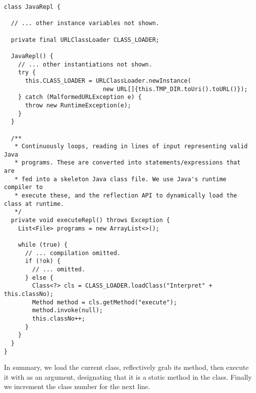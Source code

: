\begin{lstlisting}[language=MyJava]
class JavaRepl {

  // ... other instance variables not shown.

  private final URLClassLoader CLASS_LOADER;

  JavaRepl() {
    // ... other instantiations not shown.
    try {
      this.CLASS_LOADER = URLClassLoader.newInstance(
                            new URL[]{this.TMP_DIR.toUri().toURL()});
    } catch (MalformedURLException e) {
      throw new RuntimeException(e);
    }
  }

  /**
   * Continuously loops, reading in lines of input representing valid Java
   * programs. These are converted into statements/expressions that are
   * fed into a skeleton Java class file. We use Java's runtime compiler to
   * execute these, and the reflection API to dynamically load the class at runtime.
   */
  private void executeRepl() throws Exception {
    List<File> programs = new ArrayList<>();

    while (true) {
      // ... compilation omitted.
      if (!ok) {
        // ... omitted.
      } else {
        Class<?> cls = CLASS_LOADER.loadClass("Interpret" + this.classNo);
        Method method = cls.getMethod("execute");
        method.invoke(null);
        this.classNo++;
      }
    }
  }
}
\end{lstlisting}

In summary, we load the current class, reflectively grab its  method, then execute it with  as an argument, designating that it is a static method in the class. Finally we increment the class number for the next line.